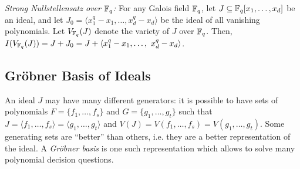 
\begin{Theorem} %
\label{thm:strong-nullsatz-fq}
{\it Strong Nullstellensatz over ${\mathbb{F}}_{q}$:} For any Galois field ${\mathbb{F}}_{q}$,
let $J \subseteq {\mathbb{F}}_{q}[x_1,\dots,   x_d]$ be an ideal, and let 
$J_0 = \langle x_1^q - x_1, \dots, x_d^q - x_d\rangle$ be
the ideal of all vanishing polynomials. Let $V_{{\mathbb{F}}_{q}}(J)$ denote the
variety of $J$ over ${\mathbb{F}}_{q}$.  Then, $I(V_{{\mathbb{F}}_{q}}(J)) = J + J_0 = J +
\langle  x_1^q - x_1, \dots, ~x_d^q - x_d\rangle$.  
\end{Theorem}





\subsection{Gr\"obner Basis of Ideals} 

An ideal $J$ may have many different generators: it is
possible to have sets of polynomials $F = \{f_1, \dots, f_s\}$ and $G
= \{g_1, \dots, g_t\}$ such that $J = \langle f_1, \dots, f_s \rangle
= \langle g_1, \dots, g_t\rangle$ and $V(J) = V(f_1, \dots, f_s) =
V(g_1, \dots, g_t)$.  Some generating sets are ``better''
than others, i.e. they are a better representation of the ideal. A
{\it Gr\"obner basis} is one such representation which allows to solve
many polynomial decision questions. 

